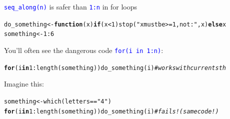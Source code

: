 \documentclass[xcolor=table,      handout ,    xcolor=dvipsnames]{beamer}\usepackage[]{graphicx}\usepackage[]{color}
\makeatletter
\newcommand{\hlnum}[1]{\textcolor[rgb]{0,0,0}{#1}}
\newcommand{\hlstr}[1]{\textcolor[rgb]{0.545,0.137,0.137}{#1}}
\newcommand{\hlcom}[1]{\textcolor[rgb]{0,0.392,0}{\textit{#1}}}
\newcommand{\hlopt}[1]{\textcolor[rgb]{0,0,0}{#1}}
\newcommand{\hlstd}[1]{\textcolor[rgb]{0,0,0}{#1}}
\newcommand{\hlkwa}[1]{\textcolor[rgb]{1,0,0}{\textbf{#1}}}
\newcommand{\hlkwb}[1]{\textcolor[rgb]{0,0,0}{#1}}
\newcommand{\hlkwc}[1]{\textcolor[rgb]{1,0,1}{#1}}
\newcommand{\hlkwd}[1]{\textcolor[rgb]{0,0,1}{#1}}
\newenvironment{kframe}{%
 \def\at@end@of@kframe{}%
 \ifinner\ifhmode%
  \def\at@end@of@kframe{\end{minipage}}%
  \begin{minipage}{\columnwidth}%
 \fi\fi%
 \def\FrameCommand##1{\hskip\@totalleftmargin \hskip-\fboxsep
 \colorbox{shadecolor}{##1}\hskip-\fboxsep
     \hskip-\linewidth \hskip-\@totalleftmargin \hskip\columnwidth}%
 \MakeFramed {\advance\hsize-\width
   \@totalleftmargin\z@ \linewidth\hsize
   \@setminipage}}%
 {\par\unskip\endMakeFramed%
 \at@end@of@kframe}
\newenvironment{knitrout}{}{} %
\newcommand{\rcode}[1]{\texttt{\textcolor{Blue}{#1}}}
\makeatother
\begin{document}
\begin{frame}[fragile]{\rcode{seq\_along(n)} is safer than \rcode{1:n} in \alert{for} loops}
\pause
\vspace{-0.5em}
\begin{knitrout}\scriptsize
{}\color{fgcolor}\begin{kframe}
\begin{alltt}
\hlstd{do_something} \hlkwb{<-} \hlkwa{function}\hlstd{(}\hlkwc{x}\hlstd{)} \hlkwa{if}\hlstd{(x}\hlopt{<}\hlnum{1}\hlstd{)} \hlkwd{stop}\hlstd{(}\hlstr{"x must be >=1, not:"}\hlstd{, x)} \hlkwa{else} \hlstd{x}
\hlstd{something} \hlkwb{<-} \hlnum{1}\hlopt{:}\hlnum{6}
\end{alltt}
\end{kframe}
\end{knitrout}
\pause
You'll often see the dangerous code \rcode{\alert{for}(i in 1:n)}: \vspace{-0.7em}
\begin{knitrout}\footnotesize
{}\color{fgcolor}\begin{kframe}
\begin{alltt}
\hlkwa{for}\hlstd{(i} \hlkwa{in} \hlnum{1}\hlopt{:}\hlkwd{length}\hlstd{(something))} \hlkwd{do_something}\hlstd{(i)} \hlcom{# works with current sth}
\end{alltt}
\end{kframe}
\end{knitrout}
\pause
Imagine this:\vspace{-0.5em}
\begin{knitrout}\footnotesize
{}\color{fgcolor}\begin{kframe}
\begin{alltt}
\hlstd{something} \hlkwb{<-} \hlkwd{which}\hlstd{(letters}\hlopt{==}\hlstr{"4"}\hlstd{)}
\hlkwa{for}\hlstd{(i} \hlkwa{in} \hlnum{1}\hlopt{:}\hlkwd{length}\hlstd{(something))} \hlkwd{do_something}\hlstd{(i)} \hlcom{# fails! (same code!)}
\end{alltt}



\end{kframe}
\end{knitrout}
\end{frame}
\end{document}
